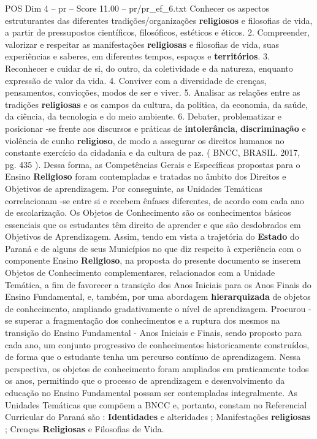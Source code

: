\begin{textsample}{POS Dim 4 – pr – Score 11.00 – pr/pr\_ef\_6.txt}
Conhecer os aspectos estruturantes das diferentes tradições/organizações \textbf{religiosos} e filosofias de vida, a partir de pressupostos científicos, filosóficos, estéticos e éticos. 2.
Compreender, valorizar e respeitar as manifestações \textbf{religiosas} e filosofias de vida, suas experiências e saberes, em diferentes tempos, espaços e \textbf{territórios}. 3.
Reconhecer e cuidar de si, do outro, da coletividade e da natureza, enquanto expressão de valor da vida. 4.
Conviver com a diversidade de crenças, pensamentos, convicções, modos de ser e viver. 5.
Analisar as relações entre as tradições \textbf{religiosas} e os campos da cultura, da política, da economia, da saúde, da ciência, da tecnologia e do meio ambiente. 6.
Debater, problematizar e posicionar -se frente aos discursos e práticas de \textbf{intolerância}, \textbf{discriminação} e violência de cunho \textbf{religioso}, de modo a assegurar os direitos humanos no constante exercício da cidadania e da cultura de paz. ( BNCC, BRASIL. 2017, pg. 435 ).
Dessa forma, as Competências Gerais e Específicas propostas para o Ensino \textbf{Religioso} foram contempladas e tratadas no âmbito dos Direitos e Objetivos de aprendizagem.
Por conseguinte, as Unidades Temáticas correlacionam -se entre si e recebem ênfases diferentes, de acordo com cada ano de escolarização.
Os Objetos de Conhecimento são os conhecimentos básicos essenciais que os estudantes têm direito de aprender e que são desdobrados em Objetivos de Aprendizagem.
Assim, tendo em vista a trajetória do \textbf{Estado} do Paraná e de alguns de seus Municípios no que diz respeito à experiência com o componente Ensino \textbf{Religioso}, na proposta do presente documento se inserem Objetos de Conhecimento complementares, relacionados com a Unidade Temática, a fim de favorecer a transição dos Anos Iniciais para os Anos Finais do Ensino Fundamental, e, também, por uma abordagem \textbf{hierarquizada} de objetos de conhecimento, ampliando gradativamente o nível de aprendizagem.
Procurou -se superar a fragmentação dos conhecimentos e a ruptura dos mesmos na transição do Ensino Fundamental - Anos Iniciais e Finais, sendo proposto para cada ano, um conjunto progressivo de conhecimentos historicamente construídos, de forma que o estudante tenha um percurso contínuo de aprendizagem.
Nessa perspectiva, os objetos de conhecimento foram ampliados em praticamente todos os anos, permitindo que o processo de aprendizagem e desenvolvimento da educação no Ensino Fundamental possam ser contempladas integralmente.
As Unidades Temáticas que compõem a BNCC e, portanto, constam no Referencial Curricular do Paraná são : \textbf{Identidades} e alteridades ; Manifestações \textbf{religiosas} ; Crenças \textbf{Religiosas} e Filosofias de Vida.

\end{textsample}
